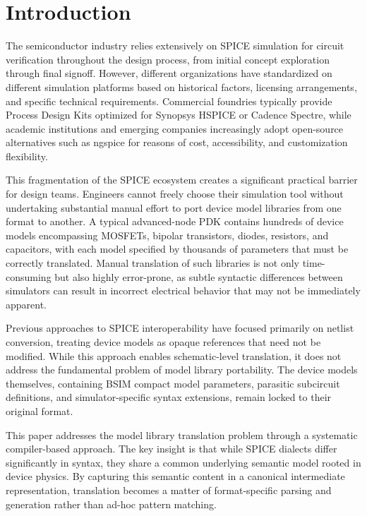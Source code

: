 \documentclass[conference]{IEEEtran}
\begin{document}
\section{Introduction}

The semiconductor industry relies extensively on SPICE simulation for circuit verification throughout the design process, from initial concept exploration through final signoff. However, different organizations have standardized on different simulation platforms based on historical factors, licensing arrangements, and specific technical requirements. Commercial foundries typically provide Process Design Kits optimized for Synopsys HSPICE or Cadence Spectre, while academic institutions and emerging companies increasingly adopt open-source alternatives such as ngspice for reasons of cost, accessibility, and customization flexibility.

This fragmentation of the SPICE ecosystem creates a significant practical barrier for design teams. Engineers cannot freely choose their simulation tool without undertaking substantial manual effort to port device model libraries from one format to another. A typical advanced-node PDK contains hundreds of device models encompassing MOSFETs, bipolar transistors, diodes, resistors, and capacitors, with each model specified by thousands of parameters that must be correctly translated. Manual translation of such libraries is not only time-consuming but also highly error-prone, as subtle syntactic differences between simulators can result in incorrect electrical behavior that may not be immediately apparent.

Previous approaches to SPICE interoperability have focused primarily on netlist conversion, treating device models as opaque references that need not be modified. While this approach enables schematic-level translation, it does not address the fundamental problem of model library portability. The device models themselves, containing BSIM compact model parameters, parasitic subcircuit definitions, and simulator-specific syntax extensions, remain locked to their original format.

This paper addresses the model library translation problem through a systematic compiler-based approach. The key insight is that while SPICE dialects differ significantly in syntax, they share a common underlying semantic model rooted in device physics. By capturing this semantic content in a canonical intermediate representation, translation becomes a matter of format-specific parsing and generation rather than ad-hoc pattern matching.
\end{document}
